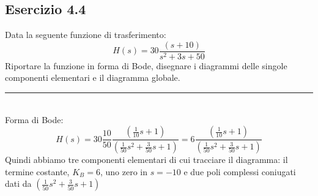 \documentclass[12pt,a4paper]{article}
\begin{document}
	\subsection*{Esercizio 4.4} Data la seguente funzione di trasferimento:
	\[
		H(s) = 30\frac{(s+10)}{s^2+3s+50}
	\]
	Riportare la funzione in forma di Bode, disegnare i diagrammi delle singole componenti elementari e il diagramma globale.
	\par\noindent\rule{\textwidth}{0.4pt}
	\vspace{5mm}
	\\
	Forma di Bode:
	\[
		H(s) = 30\frac{10}{50}\frac{\left(\frac{1}{10}s+1\right)}{\left(\frac{1}{50}s^2+\frac{3}{50}s+1\right)} = 6\frac{\left(\frac{1}{10}s+1\right)}{\left(\frac{1}{50}s^2+\frac{3}{50}s+1\right)} 
	\]
	Quindi abbiamo tre componenti elementari di cui tracciare il diagramma: il termine costante, $K_B = 6$, uno zero in $s = -10$ e due poli complessi coniugati dati da $\left(\frac{1}{50}s^2+\frac{3}{50}s+1\right)$\\
\end{document}
